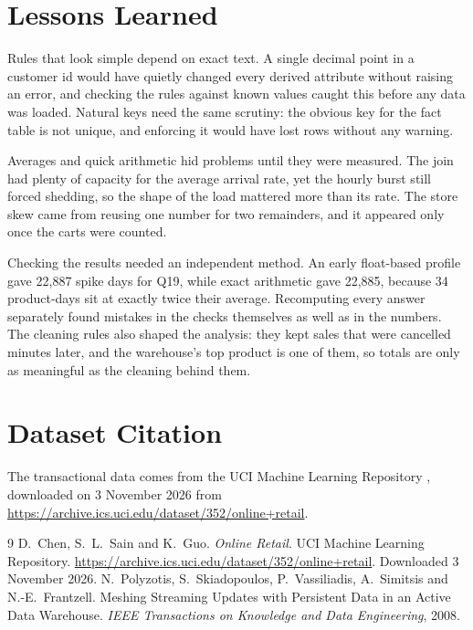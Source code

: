 \documentclass[11pt,a4paper]{article}
\begin{document}
\section{Lessons Learned}

Rules that look simple depend on exact text. A single decimal point in a customer id would have quietly changed every derived attribute without raising an error, and checking the rules against known values caught this before any data was loaded. Natural keys need the same scrutiny: the obvious key for the fact table is not unique, and enforcing it would have lost rows without any warning.

Averages and quick arithmetic hid problems until they were measured. The join had plenty of capacity for the average arrival rate, yet the hourly burst still forced shedding, so the shape of the load mattered more than its rate. The store skew came from reusing one number for two remainders, and it appeared only once the carts were counted.

Checking the results needed an independent method. An early float-based profile gave 22,887 spike days for Q19, while exact arithmetic gave 22,885, because 34 product-days sit at exactly twice their average. Recomputing every answer separately found mistakes in the checks themselves as well as in the numbers. The cleaning rules also shaped the analysis: they kept sales that were cancelled minutes later, and the warehouse's top product is one of them, so totals are only as meaningful as the cleaning behind them.

\section{Dataset Citation}

The transactional data comes from the UCI Machine Learning Repository \cite{chen}, downloaded on 3 November 2026 from \url{https://archive.ics.uci.edu/dataset/352/online+retail}.

\begin{thebibliography}{9}
   D.~Chen, S.~L.~Sain and K.~Guo. \emph{Online Retail}. UCI Machine Learning Repository. \url{https://archive.ics.uci.edu/dataset/352/online+retail}. Downloaded 3 November 2026.
   N.~Polyzotis, S.~Skiadopoulos, P.~Vassiliadis, A.~Simitsis and N.-E.~Frantzell. Meshing Streaming Updates with Persistent Data in an Active Data Warehouse. \emph{IEEE Transactions on Knowledge and Data Engineering}, 2008.
\end{thebibliography}
\end{document}
